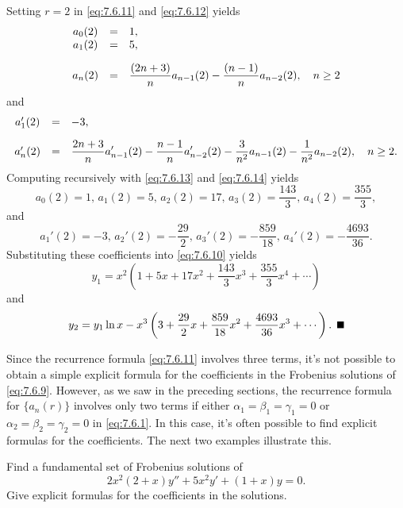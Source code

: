 \begin{examplesolution}
Setting $r=2$ in \eqref{eq:7.6.11} and \eqref{eq:7.6.12} yields
\begin{equation}
  \label{eq:7.6.13}
  \begin{array}{ccl}
    a_{0}(2) & = & 1,                                                                      \\
    a_{1}(2) & = & 5,                                                                      \\[10pt]
    a_{n}(2) & = & \displaystyle{\frac{(2n+3)}{n} a_{n-1}(2)-\frac{(n-1)}{n}a_{n-2}(2)},\quad n\ge2
  \end{array}
\end{equation}
and
\begin{equation}
  \label{eq:7.6.14}
  \begin{array}{ccl}
    a_{1}'(2) & = & -3,                                                                                                                        \\[10pt]
    a'_{n}(2) & = & \displaystyle{\frac{2n+3}{n}a'_{n-1}(2)-\frac{n-1}{n}a'_{n-2}(2) -\frac{3}{n^{2}}a_{n-1}(2)-\frac{1}{n^{2}}a_{n-2}(2)},\quad n\ge2.
  \end{array}
\end{equation}
Computing recursively with \eqref{eq:7.6.13} and \eqref{eq:7.6.14} yields
\[
  a_{0}(2)=1,\,a_{1}(2)=5,\,a_{2}(2)=17,\,a_{3}(2)=\frac{143}{3},\,a_{4}(2)=\frac{355}{3},
\]
and
\[
  a_{1}'(2)=-3,\,a_{2}'(2)=-\frac{29}{2},\,a_{3}'(2)=-\frac{859}{18}, \,a_{4}'(2)=-\frac{4693}{36}.
\]
Substituting these coefficients into \eqref{eq:7.6.10} yields
\[
  y_{1}=x^{2}\left(1+5x+17x^{2}+\frac{143}{3}x^{3}+\frac{355}{3}x^{4}+\cdots\right)
\]
and
\[
  y_{2}=y_{1}\ln x -x^{3}\left(3+\frac{29}{2}x+\frac{859}{18}x^{2}+\frac{4693}{36}x^{3}+\cdots\right).\bbox
\]
\end{examplesolution}

Since the recurrence formula \eqref{eq:7.6.11} involves three terms, it's not possible to obtain a
simple explicit formula for the coefficients in the Frobenius solutions of \eqref{eq:7.6.9}.
However, as we saw in the preceding sections, the recurrence formula for $\{a_{n}(r)\}$ involves
only two terms if either $\alpha_{1}=\beta_{1}=\gamma_{1}=0$ or $\alpha_{2}=\beta_{2}=\gamma_{2}=0$
in \eqref{eq:7.6.1}. In this case, it's often possible to find explicit formulas for the
coefficients. The next two examples illustrate this.

\begin{example}
  \label{example:7.6.2} \rm Find a fundamental set of Frobenius solutions of
  \begin{equation}
    \label{eq:7.6.15}2x^{2}(2+x)y''+5x^{2}y'+(1+x)y=0.
  \end{equation}
  Give explicit formulas for the coefficients in the solutions.
\end{example}

